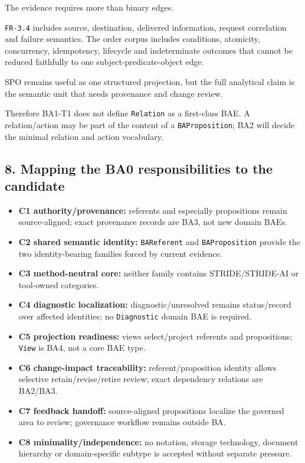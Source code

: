 \documentclass[
]{article}
\providecommand{\tightlist}{%
  \setlength{\itemsep}{0pt}\setlength{\parskip}{0pt}}
\begin{document}
The evidence requires more than binary edges.

\texttt{FR-3.4} includes source, destination, delivered information,
request correlation and failure semantics. The order corpus includes
conditions, atomicity, concurrency, idempotency, lifecycle and
indeterminate outcomes that cannot be reduced faithfully to one
subject-predicate-object edge.

SPO remains useful as one structured projection, but the full analytical
claim is the semantic unit that needs provenance and change review.

Therefore BA1-T1 does not define \texttt{Relation} as a first-class BAE.
A relation/action may be part of the content of a
\texttt{BAProposition}; BA2 will decide the minimal relation and action
vocabulary.

\subsection{8. Mapping the BA0 responsibilities to the
candidate}\label{8-mapping-the-ba0-responsibilities-to-the-candidate}

\begin{itemize}
\tightlist
\item
  \textbf{C1 authority/provenance:} referents and especially
  propositions remain source-aligned; exact provenance records are BA3,
  not new domain BAEs.
\item
  \textbf{C2 shared semantic identity:} \texttt{BAReferent} and
  \texttt{BAProposition} provide the two identity-bearing families
  forced by current evidence.
\item
  \textbf{C3 method-neutral core:} neither family contains
  STRIDE/STRIDE-AI or tool-owned categories.
\item
  \textbf{C4 diagnostic localization:} diagnostic/unresolved remains
  status/record over affected identities; no \texttt{Diagnostic} domain
  BAE is required.
\item
  \textbf{C5 projection readiness:} views select/project referents and
  propositions; \texttt{View} is BA4, not a core BAE type.
\item
  \textbf{C6 change-impact traceability:} referent/proposition identity
  allows selective retain/revise/retire review; exact dependency
  relations are BA2/BA3.
\item
  \textbf{C7 feedback handoff:} source-aligned propositions localize the
  governed area to review; governance workflow remains outside BA.
\item
  \textbf{C8 minimality/independence:} no notation, storage technology,
  document hierarchy or domain-specific subtype is accepted without
  separate pressure.
\end{itemize}
\end{document}
